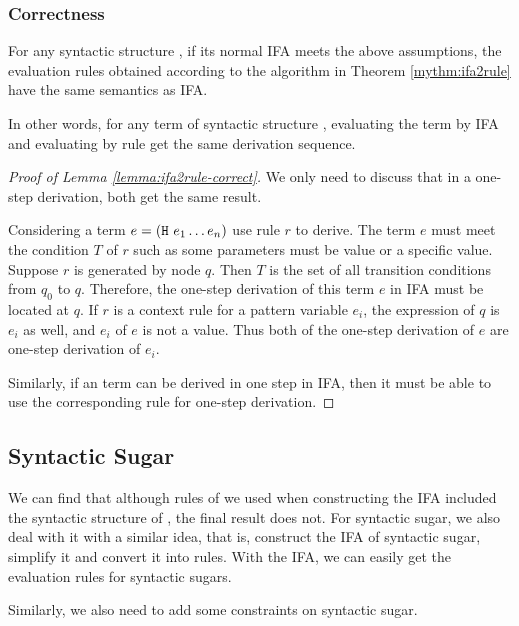 \subsubsection{Correctness}

\begin{lemma}
    \label{lemma:ifa2rule-correct}
    For any syntactic structure , if its normal IFA meets the above assumptions, the evaluation rules obtained according to the algorithm in Theorem \ref{mythm:ifa2rule} have the same semantics as IFA.
\end{lemma}

In other words, for any term of syntactic structure , evaluating the term by IFA and evaluating by rule get the same derivation sequence.

\begin{proof}[Proof of Lemma \ref{lemma:ifa2rule-correct}]
    We only need to discuss that in a one-step derivation, both get the same result.

    Considering a term $e=(\mbox{\tt H}~e_1 \ldots e_n)$ use rule $r$ to derive. The term $e$ must meet the condition $T$ of $r$ such as some parameters must be value or a specific value. Suppose $r$ is generated by node $q$. Then $T$ is the set of all transition conditions from $q_0$ to $q$. Therefore, the one-step derivation of this term $e$ in IFA must be located at $q$. If $r$ is a context rule for a pattern variable $e_i$, the expression of $q$ is $e_i$ as well, and $e_i$ of $e$ is not a value. Thus both of the one-step derivation of $e$ are one-step derivation of $e_i$.

    Similarly, if an term can be derived in one step in IFA, then it must be able to use the corresponding rule for one-step derivation.
\end{proof}

\subsection{Syntactic Sugar}

We can find that although rules of  we used when constructing the IFA included the syntactic structure of , the final result does not. For syntactic sugar, we also deal with it with a similar idea, that is, construct the IFA of syntactic sugar, simplify it and convert it into rules. With the IFA, we can easily get the evaluation rules for syntactic sugars.

Similarly, we also need to add some constraints on syntactic sugar.

